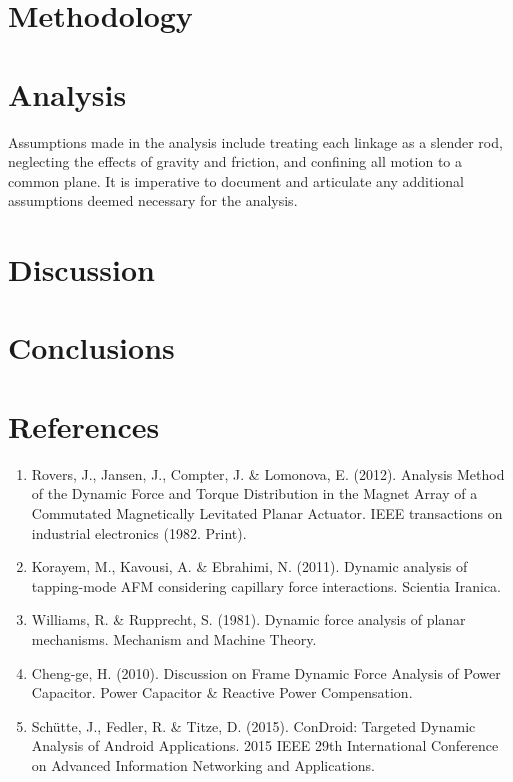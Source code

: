 \documentclass[12pt, titlepage]{article}
\begin{document}
\section{Methodology}
\newpage
\section{Analysis}
Assumptions made in the analysis include treating each linkage as a slender
rod, neglecting the effects of gravity and friction, and confining all motion
to a common plane. It is imperative to document and articulate any additional
assumptions deemed necessary for the analysis.
\newpage
\section{Discussion}
\newpage
\section{Conclusions}
\newpage
\section{References}
\begin{enumerate}
  \item \label{item:rovers2012} Rovers, J., Jansen, J., Compter, J. \& Lomonova, E. (2012). Analysis Method of the Dynamic Force and Torque Distribution in the Magnet Array of a Commutated Magnetically Levitated Planar Actuator. IEEE transactions on industrial electronics (1982. Print).
  \item \label{item:korayem2011} Korayem, M., Kavousi, A. \& Ebrahimi, N. (2011). Dynamic analysis of tapping-mode AFM considering capillary force interactions. Scientia Iranica.
  \item \label{item:williams1981} Williams, R. \& Rupprecht, S. (1981). Dynamic force analysis of planar mechanisms. Mechanism and Machine Theory.
  \item \label{item:cheng2010} Cheng-ge, H. (2010). Discussion on Frame Dynamic Force Analysis of Power Capacitor. Power Capacitor \& Reactive Power Compensation.
  \item \label{item:shutte2015} Schütte, J., Fedler, R. \& Titze, D. (2015). ConDroid: Targeted Dynamic Analysis of Android Applications. 2015 IEEE 29th International Conference on Advanced Information Networking and Applications.
\end{enumerate}
\end{document}
